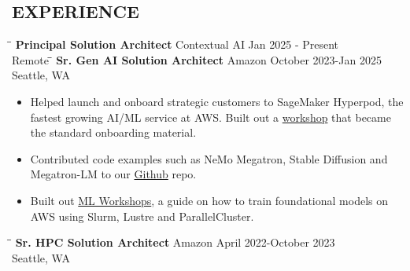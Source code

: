 \documentclass{res}
\begin{document}
\begin{resume}
\section{EXPERIENCE}
\vspace{-0.10in}
 \begin{tabbing}
   \hspace{2.5in}\= \hspace{2.6in}\= \kill %
   {\bf Principal Solution Architect} \>Contextual AI          \>Jan 2025 - Present\\
                              \>Remote
   \vspace{-0.10in}
   \hspace{2.5in}\= \hspace{2.6in}\= \kill %
    {\bf Sr. Gen AI Solution Architect} \>Amazon     \>October 2023-Jan 2025\\
                             \>Seattle, WA
   \end{tabbing}\vspace{-10pt}      %
   \begin{itemize}
   \setlength\itemsep{0em}
    \item Helped launch and onboard strategic customers to SageMaker Hyperpod, the fastest growing AI/ML service at AWS. Built out a \href{https://catalog.workshops.aws/sagemaker-hyperpod}{workshop} that became the standard onboarding material.
    \item Contributed code examples such as NeMo Megatron, Stable Diffusion and Megatron-LM to our \href{https://github.com/aws-samples/awsome-distributed-training/}{Github} repo.
    \item Built out \href{https://mlworkshops.com}{ML Workshops}, a guide on how to train foundational models on AWS using Slurm, Lustre and ParallelCluster.
    \end{itemize}
\vspace{-0.10in}
 \begin{tabbing}
   \hspace{2.5in}\= \hspace{2.6in}\= \kill %
    {\bf Sr. HPC Solution Architect} \>Amazon     \>April 2022-October 2023\\
                             \>Seattle, WA
   \end{tabbing}\vspace{-10pt}      %
   \begin{itemize}

\end{itemize}
\end{resume}
\end{document}
